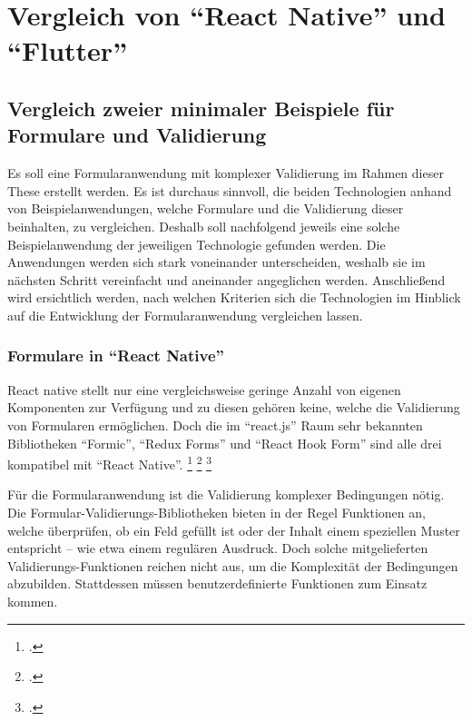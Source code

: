 \clearpage
\section{Vergleich von \enquote{React Native} und \enquote{Flutter}}
\label{sec:Vergleich-React-Native-und-Flutter}

\subsection{Vergleich zweier minimaler Beispiele für Formulare und Validierung}


Es soll eine Formularanwendung mit komplexer Validierung im Rahmen dieser These erstellt werden.
Es ist durchaus sinnvoll, die beiden Technologien anhand von  Beispielanwendungen, welche Formulare und die Validierung dieser  beinhalten,   zu vergleichen.
Deshalb soll nachfolgend  jeweils eine solche Beispielanwendung der jeweiligen Technologie gefunden werden.
Die Anwendungen werden sich stark voneinander unterscheiden, weshalb sie im nächsten Schritt vereinfacht und aneinander angeglichen werden.
Anschließend wird ersichtlich werden, nach welchen Kriterien sich die Technologien im Hinblick auf die Entwicklung der Formularanwendung vergleichen lassen.

\subsubsection{Formulare in \enquote{React Native}}

React native stellt nur eine vergleichsweise geringe Anzahl von eigenen Komponenten zur Verfügung und zu diesen gehören keine, welche die Validierung von Formularen ermöglichen.
Doch die im \enquote{react.js} Raum sehr bekannten Bibliotheken \enquote{Formic}, \enquote{Redux Forms} und \enquote{React Hook Form} sind alle drei kompatibel mit \enquote{React Native}.
\footcite[Vgl.][]{ReactNativeFormikDocs}
\footcite[Vgl.][]{DoesReduxFormWorkWithReactNative}
\footcite[Vgl.][]{ReactNativeReactHookFormGetStarted}


Für die Formularanwendung ist die Validierung komplexer Bedingungen nötig.
Die Formular-Validierungs-Bibliotheken bieten in der Regel Funktionen an, welche überprüfen, ob ein Feld gefüllt ist oder der Inhalt einem speziellen Muster entspricht -- wie etwa einem regulären Ausdruck.
Doch solche mitgelieferten Validierungs-Funktionen reichen nicht aus, um die Komplexität der Bedingungen abzubilden.
Stattdessen müssen benutzerdefinierte Funktionen zum Einsatz kommen.

